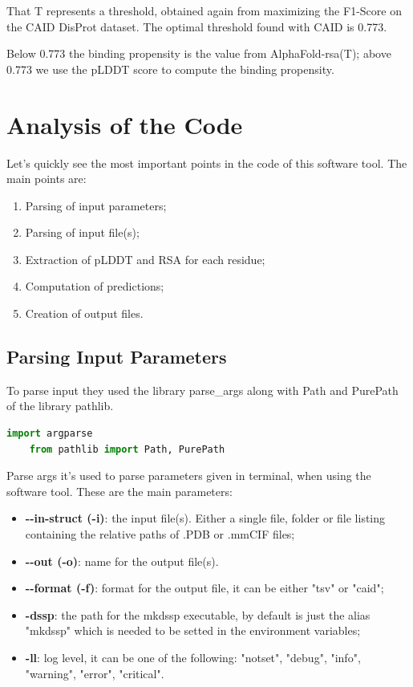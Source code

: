 That T represents a threshold, obtained again from maximizing the F1-Score on the CAID DisProt dataset. The optimal threshold found with CAID is 0.773. 

Below 0.773 the binding propensity is the value from AlphaFold-rsa(T); above 0.773 we use the pLDDT score to compute the binding propensity.

\section{Analysis of the Code}
Let's quickly see the most important points in the code of this software tool. The main points are: 
\begin{enumerate}

    \item Parsing of input parameters;
    \item Parsing of input file(s);
    \item Extraction of pLDDT and RSA for each residue;
    \item Computation of predictions;
    \item Creation of output files.
\end{enumerate}

\pagebreak

\subsection{Parsing Input Parameters}
To parse input they used the library parse\_args along with Path and PurePath of the library pathlib.

\begin{lstlisting}[language=Python, caption=Import\ libraries\ parsing, label={code:parseargs}]
    import argparse
    from pathlib import Path, PurePath
\end{lstlisting}

Parse args it's used to parse parameters given in terminal, when using the software tool. These are the main parameters:
\begin{itemize}
    \item \textbf{-\vspace{0.1cm}-in-struct (-i)}: the input file(s). Either a single file, folder or file listing containing the relative paths of .PDB or .mmCIF files;
    \item \textbf{-\vspace{0.1cm}-out (-o)}: name for the output file(s).
    \item \textbf{-\vspace{0.1cm}-format (-f)}: format for the output file, it can be either "tsv" or "caid";
    \item \textbf{-dssp}: the path for the mkdssp executable, by default is just the alias "mkdssp" which is needed to be setted in the environment variables;
    \item \textbf{-ll}: log level, it can be one of the following: "notset", "debug", "info", "warning", "error", "critical".
\end{itemize}


